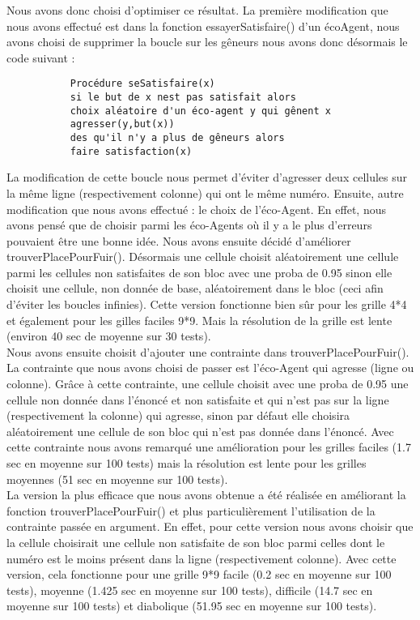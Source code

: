 	Nous avons donc choisi d'optimiser ce résultat. La première modification que nous avons effectué est dans la fonction essayerSatisfaire() d'un écoAgent, nous avons choisi de supprimer la boucle sur les gêneurs nous avons donc désormais le code suivant :
	 \begin{verbatim}
           Procédure seSatisfaire(x) 
           si le but de x nest pas satisfait alors 
           choix aléatoire d'un éco-agent y qui gênent x 
           agresser(y,but(x))
           des qu'il n'y a plus de gêneurs alors 
           faire satisfaction(x)
     \end{verbatim}
     La modification de cette boucle nous permet d'éviter d'agresser deux cellules sur la même ligne (respectivement colonne) qui ont le même numéro. Ensuite, autre modification que nous avons effectué : le choix de l'éco-Agent. En effet, nous avons pensé que de choisir parmi les éco-Agents où il y a le plus d'erreurs pouvaient être une bonne idée. Nous avons ensuite décidé d'améliorer trouverPlacePourFuir(). Désormais une cellule choisit aléatoirement une cellule parmi les cellules non satisfaites de son bloc avec une proba de 0.95 sinon elle choisit une cellule, non donnée de base, aléatoirement dans le bloc (ceci afin d'éviter les boucles infinies). Cette version fonctionne bien sûr pour les grille 4*4 et également pour les gilles faciles 9*9. Mais la résolution de la grille est lente (environ 40 sec de moyenne sur 30 tests). \\
     
     Nous avons ensuite choisit d'ajouter une contrainte dans trouverPlacePourFuir(). La contrainte que nous avons choisi de passer est l'éco-Agent qui agresse (ligne ou colonne). Grâce à cette contrainte, une cellule choisit avec une proba de 0.95 une cellule non donnée dans l'énoncé et non satisfaite et qui n'est pas sur la ligne (respectivement la colonne) qui agresse,  sinon par défaut elle choisira aléatoirement une cellule de son bloc qui n'est pas donnée dans l'énoncé. Avec cette contrainte nous avons remarqué une amélioration pour les grilles faciles (1.7 sec en moyenne sur 100 tests) mais la résolution est lente pour les grilles moyennes (51 sec en moyenne sur 100 tests). \\
     
     La version la plus efficace que nous avons obtenue a été réalisée en améliorant la fonction trouverPlacePourFuir() et plus particulièrement l'utilisation de la contrainte passée en argument. En effet, pour cette version nous avons choisir que la cellule choisirait une cellule non satisfaite de son bloc parmi celles dont le numéro est le moins présent dans la ligne (respectivement colonne). Avec cette version, cela fonctionne pour une grille 9*9 facile (0.2 sec en moyenne sur 100 tests), moyenne (1.425 sec en moyenne sur 100 tests), difficile (14.7 sec en moyenne sur 100 tests) et diabolique (51.95 sec en moyenne sur 100 tests). \\
     
